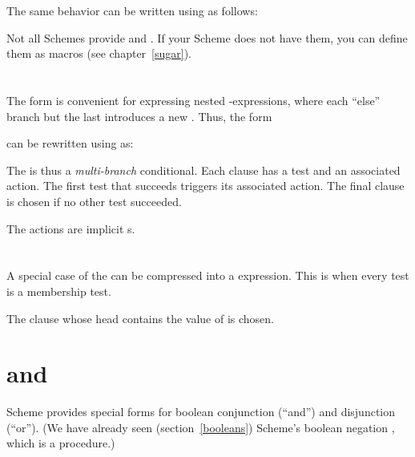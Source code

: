 The same behavior can be written using  as
follows:


\n Not all Schemes provide  and .
If your Scheme does not have them, you can 
define them as macros (see chapter~\ref{sugar}).

\section{}

The  form is convenient for expressing nested
-expressions, where each “else” branch but the last
introduces a new .  Thus, the form 


can be rewritten using  as:


The  is thus a {\em multi-branch} conditional.  Each
clause has a test and an associated action.  The first
test that succeeds triggers its associated action.  The
final  clause is chosen if no other test
succeeded.

The  actions are implicit s.

\section{}

A special case of the  can be compressed into a
 expression.  This is when every test is a
membership test.


The clause whose head contains the value of  is chosen.

\section{ and }

Scheme provides special forms for boolean conjunction
(“and”) and disjunction (“or”).  (We have already
seen (section~\ref{booleans}) Scheme’s boolean negation
, which is a 
procedure.) 

